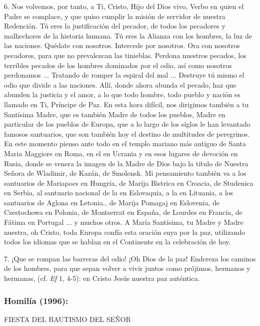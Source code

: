 \begin{body}
	6. Nos volvemos, por tanto, a Ti, Cristo, Hijo del Dios vivo, Verbo en quien el Padre se complace, y que quiso cumplir la misión de servidor de nuestra Redención. Tú eres la justificación del pecador, de todos los pecadores y malhechores de la historia humana. Tú eres la Alianza con los hombres, la luz de las naciones. Quédate con nosotros. Intercede por nosotros. Ora con nosotros pecadores, para que no prevalezcan las tinieblas. Perdona nuestros pecados, los terribles pecados de los hombres dominados por el odio, así como nosotros perdonamos ... Tratando de romper la espiral del mal ... Destruye tú mismo el odio que divide a las naciones. Allí, donde ahora abunda el pecado, haz que abunden la justicia y el amor, a lo que todo hombre, todo pueblo y nación es llamado en Ti, Príncipe de Paz. En esta hora difícil, nos dirigimos también a tu Santísima Madre, que es también Madre de todos los pueblos, Madre en particular de los pueblos de Europa, que a lo largo de los siglos le han levantado famosos santuarios, que son también hoy el destino de multitudes de peregrinos. En este momento pienso ante todo en el templo mariano más antiguo de Santa Maria Maggiore en Roma, en el  en Ucrania y en esos lugares de devoción en Rusia, donde se venera la imagen de la Madre de Dios bajo la título de Nuestra Señora de Wladimir, de Kazán, de Smolensk. Mi pensamiento también va a los santuarios de Mariapocs en Hungría, de Marija Bistrica en Croacia, de Studenica en Serbia, al santuario nacional de la  en Eslovaquia, a la  en Lituania, a los santuarios de Aglona en Letonia., de Marija Pomagaj en Eslovenia, de Czestochowa en Polonia, de Montserrat en España, de Lourdes en Francia, de Fátima en Portugal ... y muchos otros. A María Santísima, tu Madre y Madre nuestra, oh Cristo, toda Europa confía esta oración suya por la paz, utilizando todos los idiomas que se hablan en el Continente en la celebración de hoy.
	
	7. ¡Que se rompan las barreras del odio! ¡Oh Dios de la paz! Endereza los caminos de los hombres, para que sepan volver a vivir juntos como prójimos, hermanos y hermanas,  (cf. \emph{Ef} 1, 4-5): en Cristo Jesús nuestra paz auténtica.
	
	\subsubsection{Homilía (1996): } FIESTA DEL BAUTISMO DEL SEÑOR
	

\end{body}
